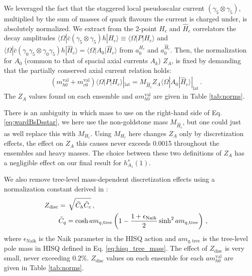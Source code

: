 We leveraged the fact that the staggered local pseudoscalar current $(\gamma_5\otimes \gamma_5)$, multiplied by the sum of masses of quark flavours the current is charged under, is absolutely normalized. We extract from the 2-point $H_c$ and $\hat{H}_c$ correlators the decay amplitudes $\langle \Omega | \bar{c} (\gamma_5\otimes \gamma_5) h | H_c \rangle \equiv \langle \Omega | P | H_c \rangle$ and $\langle \Omega | \bar{c} (\gamma_0\gamma_5 \otimes \gamma_0\gamma_5) h | \hat{H}_c \rangle = \langle \Omega | A_0 | \hat{H}_c \rangle$ from $a_0^{H_c}$ and $a_0^{\hat{H}_c}$. Then, the normalization for $A_0$ (common to that of spacial axial currents $A_k$) $Z_A$, is fixed by demanding that the partially conserved axial current relation holds:
\begin{align}
  (m^{\text{val}}_{h0} + m^{\text{val}}_{c0}) \langle \Omega | P | H_c \rangle|_{\text{lat}} = M_{\hat{H}_c} Z_A \langle \Omega | A_0 | \hat{H}_c \rangle|_{\text{lat}}\,.
  \label{eq:wardBsDsstar}
\end{align}
The $Z_A$ values found on each ensemble and $am^{\text{val}}_{h0}$ are given in Table \ref{tab:norms}.

There is an ambiguity in which mass to use on the right-hand side of Eq. \eqref{eq:wardBsDsstar}, we here use the non-goldstone mass $M_{\hat{H}_c}$, but one could just as well replace this with $M_{H_c}$. Using $M_{H_c}$ here changes $Z_A$ only by discretization effects, the effect on $Z_A$ this causes never exceeds 0.0015 throughout the ensembles and heavy masses. The choice between these two definitions of $Z_A$ has a negligible effect on our final result for $h^s_{A_1}(1)$.

We also remove tree-level mass-dependent discretization effects using a normalization constant derived in \cite{Monahan:2012dq,Bazavov:2017lyh}:
\begin{align}
  \label{eq:Zdisc}
  Z_{\text{disc}} &=\,\sqrt{ \tilde{C}_h \tilde{C}_c }\,, \\
  \nonumber
  &\tilde{C}_q = \cosh am_{q,\text{tree}} \left( 1 - {1+\epsilon_{\text{Naik}}\over 2} \sinh^2 am_{q,\text{tree}} \right)\,,
\end{align}
where $\epsilon_{\text{Naik}}$ is the Naik parameter in the HISQ action and $am_{q,\text{tree}}$ is the tree-level pole mass in HISQ defined in Eq. \eqref{eq:hisq_tree_mass}. The effect of $Z_{\text{disc}}$ is very small, never exceeding $0.2\%$. $Z_{\text{disc}}$ values on each ensemble for each $am^{\text{val}}_{h0}$ are given in Table \ref{tab:norms}.

